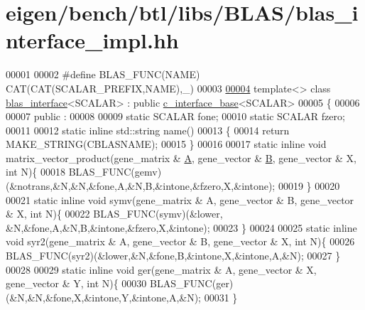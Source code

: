 \hypertarget{eigen_2bench_2btl_2libs_2_b_l_a_s_2blas__interface__impl_8hh_source}{}\section{eigen/bench/btl/libs/\+B\+L\+A\+S/blas\+\_\+interface\+\_\+impl.hh}
\label{eigen_2bench_2btl_2libs_2_b_l_a_s_2blas__interface__impl_8hh_source}

\begin{DoxyCode}
00001 
00002 \textcolor{preprocessor}{#define BLAS\_FUNC(NAME) CAT(CAT(SCALAR\_PREFIX,NAME),\_)}
00003 
\hyperlink{classblas__interface_3_01_s_c_a_l_a_r_01_4}{00004} \textcolor{keyword}{template}<> \textcolor{keyword}{class }\hyperlink{classblas__interface}{blas\_interface}<SCALAR> : \textcolor{keyword}{public} \hyperlink{classc__interface__base}{c\_interface\_base}<SCALAR>
00005 \{
00006 
00007 public :
00008   
00009   \textcolor{keyword}{static} SCALAR fone;
00010   \textcolor{keyword}{static} SCALAR fzero;
00011 
00012   \textcolor{keyword}{static} \textcolor{keyword}{inline} std::string name()
00013   \{
00014     \textcolor{keywordflow}{return} MAKE\_STRING(CBLASNAME);
00015   \}
00016 
00017   \textcolor{keyword}{static} \textcolor{keyword}{inline} \textcolor{keywordtype}{void} matrix\_vector\_product(gene\_matrix & \hyperlink{group___core___module_class_eigen_1_1_matrix}{A}, gene\_vector & \hyperlink{group___core___module_class_eigen_1_1_matrix}{B}, gene\_vector & X, \textcolor{keywordtype}{int} N)\{
00018     BLAS\_FUNC(gemv)(&notrans,&N,&N,&fone,A,&N,B,&intone,&fzero,X,&intone);
00019   \}
00020 
00021   \textcolor{keyword}{static} \textcolor{keyword}{inline} \textcolor{keywordtype}{void} symv(gene\_matrix & A, gene\_vector & B, gene\_vector & X, \textcolor{keywordtype}{int} N)\{
00022     BLAS\_FUNC(symv)(&lower, &N,&fone,A,&N,B,&intone,&fzero,X,&intone);
00023   \}
00024 
00025   \textcolor{keyword}{static} \textcolor{keyword}{inline} \textcolor{keywordtype}{void} syr2(gene\_matrix & A, gene\_vector & B, gene\_vector & X, \textcolor{keywordtype}{int} N)\{
00026     BLAS\_FUNC(syr2)(&lower,&N,&fone,B,&intone,X,&intone,A,&N);
00027   \}
00028 
00029   \textcolor{keyword}{static} \textcolor{keyword}{inline} \textcolor{keywordtype}{void} ger(gene\_matrix & A, gene\_vector & X, gene\_vector & Y, \textcolor{keywordtype}{int} N)\{
00030     BLAS\_FUNC(ger)(&N,&N,&fone,X,&intone,Y,&intone,A,&N);
00031   \}

\end{DoxyCode}
